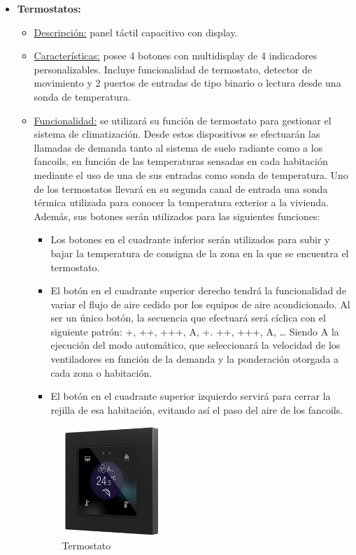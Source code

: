 \begin{itemize}
\item \textbf{Termostatos:} 
	\begin{itemize}
	\item\underline{Descripción:} panel táctil capacitivo con display.
	\item \underline{Características:} posee 4 botones con multidisplay de 4 indicadores personalizables. Incluye funcionalidad de termostato, detector de movimiento y 2 puertos de entradas de tipo binario o lectura desde una sonda de temperatura.
	\item \underline{Funcionalidad:} se utilizará su función de termostato para gestionar el sistema de climatización. Desde estos dispositivos se efectuarán las llamadas de demanda tanto al sistema de suelo radiante como a los fancoils, en función de las temperaturas sensadas en cada habitación mediante el uso de una de sus entradas como sonda de temperatura. Uno de los termostatos llevará en su segunda canal de entrada una sonda térmica utilizada para conocer la temperatura exterior a la vivienda. Además, sus botones serán utilizados para las siguientes funciones:
		\begin{itemize}
		\item Los botones en el cuadrante inferior serán utilizados para subir y bajar la temperatura de consigna de la zona en la que se encuentra el termostato.
		\item El botón en el cuadrante superior derecho tendrá la funcionalidad de variar el flujo de aire cedido por los equipos de aire acondicionado. Al ser un único botón, la secuencia que efectuará será cíclica con el siguiente patrón: +, ++, +++, A, +. ++, +++, A, … Siendo A la ejecución del modo automático, que seleccionará la velocidad de los ventiladores en función de la demanda y la ponderación otorgada a cada zona o habitación.
		\item El botón en el cuadrante superior izquierdo servirá para cerrar la rejilla de esa habitación, evitando así el paso del aire de los fancoils.
		\end{itemize} 
	\begin{figure}[h]
	\centering
	\includegraphics[width=0.37\textwidth]{figures/termostato.png}   
	\caption{Termostato}
	\label{fig:termostato}
	\end{figure}
	\end{itemize} 


\end{itemize}
